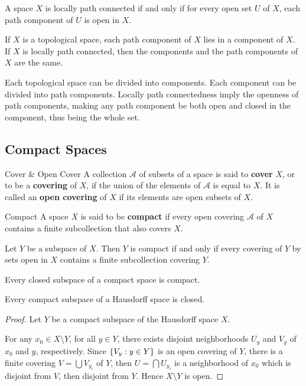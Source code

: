 \documentclass[12pt,a4paper]{article}
\begin{document}
    \begin{thm}
        A space $X$ is locally path connected if and only if for every open set $U$ of $X$, each path component of $U$ is open in $X$.
    \end{thm}
    \hfill

    \begin{thm}
        If $X$ is a topological space, each path component of $X$ lies in a component of $X$. If $X$ is locally path connected, then the components and the path components of $X$ are the same.
    \end{thm}
    \begin{remark}
        Each topological space can be divided into components. Each component can be divided into path components. Locally path connectedness imply the openness of path components, making any path component be both open and closed in the component, thus being the whole set.
    \end{remark}

    \subsection{Compact Spaces}
    \begin{defi}{Cover \& Open Cover}
        A collection $\mathcal{A}$ of subsets of a space is said to \textbf{cover} $X$, or to be a \textbf{covering} of $X$, if the union of the elements of $\mathcal{A}$ is equal to $X$. It is called an \textbf{open covering} of $X$ if its elements are open subsets of $X$.
    \end{defi}
    \hfill
    
    \begin{defi}{Compact}
        A space $X$ is said to be \textbf{compact} if every open covering $\mathcal{A}$ of $X$ contains a finite subcollection that also covers $X$.
    \end{defi}
    \hfill

    \begin{lemma}
        Let $Y$ be a subspace of $X$. Then $Y$ is compact if and only if every covering of $Y$ by sets open in $X$ contains a finite subcollection covering $Y$.
    \end{lemma}
    \hfill

    \begin{thm}
        Every closed subspace of a compact space is compact.
    \end{thm}
    \hfill

    \begin{thm}
        Every compact subspace of a Hausdorff space is closed.
    \end{thm}
    \begin{proof}
        Let $Y$ be a compact subspace of the Hausdorff space $X$.

        For any $x_0\in X\setminus Y$, for all $y\in Y$, there exists disjoint neighborhoods $U_y$ and $V_y$ of $x_0$ and $y$, respectively. Since $\left\{V_y:y\in Y\right\}$ is an open covering of $Y$, there is a finite covering $V=\bigcup V_{y_i}$ of $Y$, then $U=\bigcap U_{y_i}$ is a neighborhood of $x_0$ which is disjoint from $V$, then disjoint from $Y$. Hence $X\setminus Y$ is open.  
    \end{proof}
\end{document}
